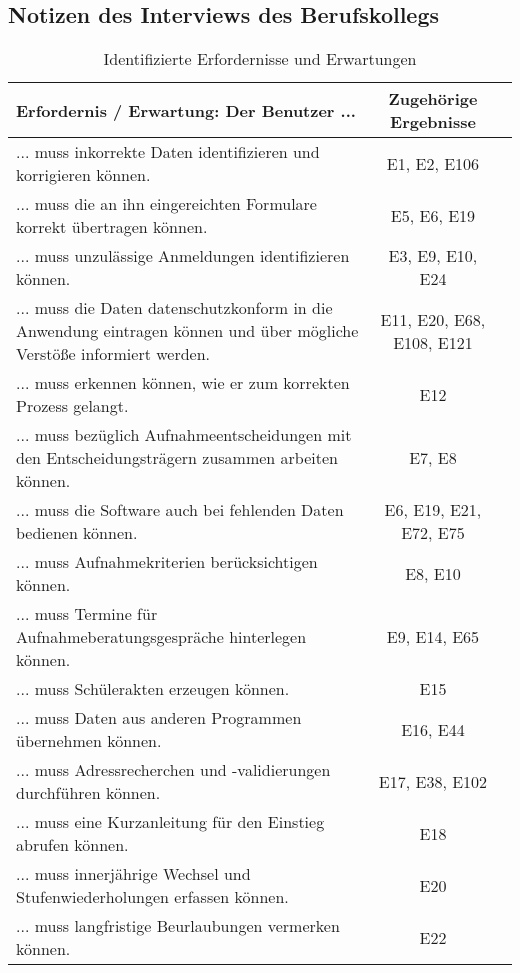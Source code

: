 \subsection{Notizen des Interviews des Berufskollegs}
\label{section-InterviewBerufskolleg}


\begin{landscape}

    \begin{longtable}{p{15cm}cc}
        \caption{Identifizierte Erfordernisse und Erwartungen} \label{tab:mytable} \\
        \toprule
        Erfordernis / Erwartung: Der Benutzer ... & Zugehörige Ergebnisse \\
        \midrule
... muss inkorrekte Daten identifizieren und korrigieren können. & E1, E2, E106 \\
... muss die an ihn eingereichten Formulare korrekt übertragen können. & E5, E6, E19 \\
... muss unzulässige Anmeldungen identifizieren können. & E3, E9, E10, E24 \\
... muss die Daten datenschutzkonform in die Anwendung eintragen können und über mögliche Verstöße informiert werden. & E11, E20, E68, E108, E121 \\
... muss erkennen können, wie er zum korrekten Prozess gelangt. & E12 \\
... muss bezüglich Aufnahmeentscheidungen mit den Entscheidungsträgern zusammen arbeiten können. & E7, E8 \\
... muss die Software auch bei fehlenden Daten bedienen können. & E6, E19, E21, E72, E75 \\
... muss Aufnahmekriterien berücksichtigen können. & E8, E10 \\
... muss Termine für Aufnahmeberatungsgespräche hinterlegen können. & E9, E14, E65 \\
... muss Schülerakten erzeugen können. & E15 \\
... muss Daten aus anderen Programmen übernehmen können. & E16, E44 \\
... muss Adressrecherchen und -validierungen durchführen können. & E17, E38, E102 \\
... muss eine Kurzanleitung für den Einstieg abrufen können. & E18 \\
... muss innerjährige Wechsel und Stufenwiederholungen erfassen können. & E20 \\
... muss langfristige Beurlaubungen vermerken können. & E22 \\

\end{longtable}
\end{landscape}
